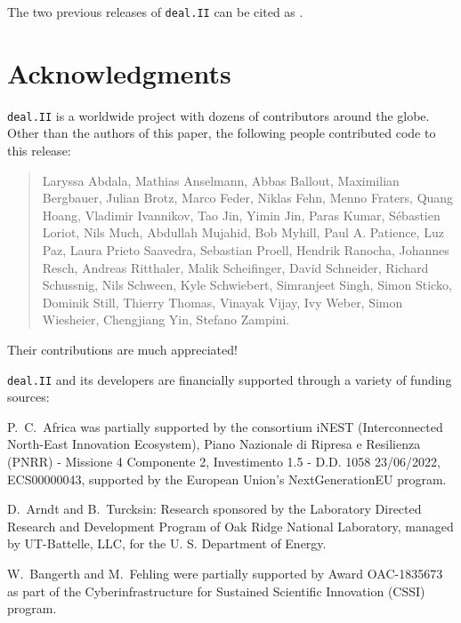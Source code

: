 \documentclass{ansarticle-preprint}
\newcommand{\specialword}[1]{\texttt{#1}}
\newcommand{\dealii}{{\specialword{deal.II}}\xspace}
\begin{document}
The two previous releases of \dealii can be cited as
\cite{dealII94,dealII95}.


\section{Acknowledgments}

\dealii is a worldwide project with dozens of contributors around the
globe. Other than the authors of this paper, the following people
contributed code to this release:\\

\begin{quote}
Laryssa      Abdala,
Mathias      Anselmann,
Abbas        Ballout,
Maximilian   Bergbauer,
Julian       Brotz,
Marco        Feder,
Niklas       Fehn,
Menno        Fraters,
Quang        Hoang,
Vladimir     Ivannikov,
Tao          Jin,
Yimin        Jin,
Paras        Kumar,
Sébastien    Loriot,
Nils         Much,
Abdullah     Mujahid,
Bob          Myhill,
Paul A.      Patience,
Luz          Paz,
Laura        Prieto Saavedra,
Sebastian    Proell,
Hendrik      Ranocha,
Johannes     Resch,
Andreas      Ritthaler,
Malik        Scheifinger,
David        Schneider,
Richard      Schussnig,
Nils         Schween,
Kyle         Schwiebert,
Simranjeet   Singh,
Simon        Sticko,
Dominik      Still,
Thierry      Thomas,
Vinayak      Vijay,
Ivy          Weber,
Simon        Wiesheier,
Chengjiang   Yin,
Stefano      Zampini.
\end{quote}
Their contributions are much appreciated!


\bigskip

\dealii and its developers are financially supported through a
variety of funding sources:

P.~C.~Africa was partially supported by the consortium iNEST (Interconnected North-East Innovation Ecosystem),
Piano Nazionale di Ripresa e Resilienza (PNRR) - Missione 4 Componente 2, Investimento 1.5 - D.D. 1058 23/06/2022,
ECS00000043, supported by the European Union's NextGenerationEU program.

D.~Arndt and B.~Turcksin: Research sponsored by the Laboratory Directed Research and
Development Program of Oak Ridge National Laboratory, managed by UT-Battelle,
LLC, for the U. S. Department of Energy.

W.~Bangerth and M.~Fehling were partially supported by Award OAC-1835673
as part of the Cyberinfrastructure for Sustained Scientific Innovation (CSSI)
program.
\end{document}
